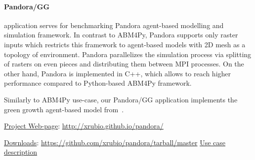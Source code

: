 \paragraph{Pandora/GG} application serves for benchmarking \textsf{Pandora} agent-based modelling and simulation framework.
In contrast to \textsf{ABM4Py}, \textsf{Pandora} supports only raster inputs
which restricts this framework to agent-based models with 2D mesh as a topology of environment.
\textsf{Pandora} parallelizes the simulation process
via splitting of rasters on even pieces and distributing them between MPI processes.
On the other hand, \textsf{Pandora} is implemented in C++,
which allows to reach higher performance compared to Python-based \textsf{ABM4Py} framework.

Similarly to \textsf{ABM4Py} use-case, our Pandora/GG application implements the green growth agent-based model from\ \cite{2017:gg_pilot}.

\iffalse
There are two implementations of his model: deterministic and a stochastic whose implementation for benchmarking purposes was used \cite{2018:abm4py}.
In this preliminary version of the green growth pilot, authors consider only two classes of cars: "green" cars, which for now correspond to battery electric vehicles due to data availability, and "brown" ones. Cars are distributed on a gridded global map, that is, in the first instance "agents" are simply cells in the grid, which automatically specifies a neighbourhood network between them, and their characteristics are a number of brown and one of green cars. Each cell at each time step computes the number of new cars to be added from the total numbers exogenous given and a percentage of cars being scrapped.
\fi

\underline{Project Web-page}: \url{http://xrubio.github.io/pandora/}

\underline{Downloads}: \url{https://github.com/xrubio/pandora/tarball/master}
\iffalse
\underline{Use case description}

